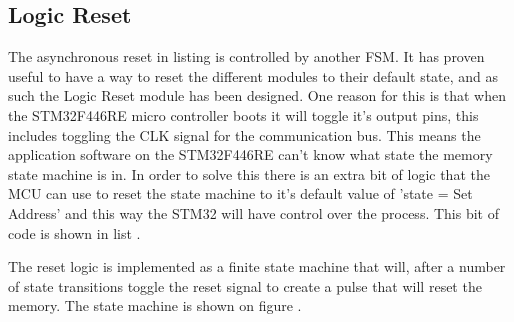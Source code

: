 \subsection*{Logic Reset}
The asynchronous reset in listing  is controlled by another FSM. It has proven useful to have a way to reset the different modules to their default state, and as such the Logic Reset module has been designed. One reason for this is that when the STM32F446RE micro controller boots it will toggle it's output pins, this includes toggling the CLK signal for the communication bus. This means the application software on the STM32F446RE can't know what state the memory state machine is in. In order to solve this there is an extra bit of logic that the MCU can use to reset the state machine to it's default value of 'state = Set Address' and this way the STM32 will have control over the process. This bit of code is shown in list . 



The reset logic is implemented as a finite state machine that will, after a number of state transitions toggle the reset signal to create a pulse that will reset the memory. The state machine is shown on figure . 

